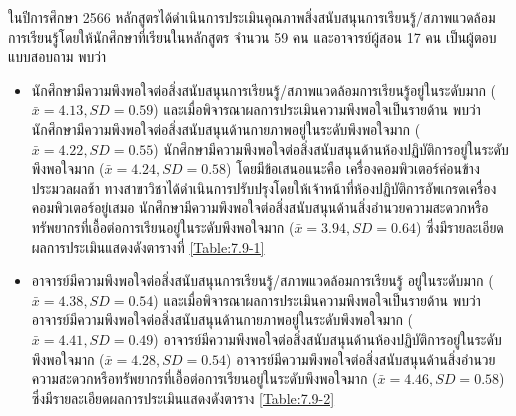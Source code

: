 ในปีการศึกษา 2566 หลักสูตรได้ดำเนินการประเมินคุณภาพสิ่งสนับสนุนการเรียนรู้/สภาพแวดล้อมการเรียนรู้โดยให้นักศึกษาที่เรียนในหลักสูตร จำนวน 59 คน และอาจารย์ผู้สอน 17 คน เป็นผู้ตอบแบบสอบถาม พบว่า
\begin{itemize}
\item นักศึกษามีความพึงพอใจต่อสิ่งสนับสนุนการเรียนรู้/สภาพแวดล้อมการเรียนรู้อยู่ในระดับมาก ($\bar x=4.13, SD=0.59$)
และเมื่อพิจารณาผลการประเมินความพึงพอใจเป็นรายด้าน พบว่านักศึกษามีความพึงพอใจต่อสิ่งสนับสนุนด้านกายภาพอยู่ในระดับพึงพอใจมาก ($\bar x=4.22, SD=0.55$)  นักศึกษามีความพึงพอใจต่อสิ่งสนับสนุนด้านห้องปฏิบัติการอยู่ในระดับพึงพอใจมาก ($\bar x=4.24, SD=0.58$) โดยมีข้อเสนอแนะคือ เครื่องคอมพิวเตอร์ค่อนข้างประมวลผลช้า ทางสาขาวิชาได้ดำเนินการปรับปรุงโดยให้เจ้าหน้าที่ห้องปฏิบัติการอัพเกรดเครื่องคอมพิวเตอร์อยู่เสมอ
นักศึกษามีความพึงพอใจต่อสิ่งสนับสนุนด้านสิ่งอำนวยความสะดวกหรือทรัพยากรที่เอื้อต่อการเรียนอยู่ในระดับพึงพอใจมาก ($\bar x=3.94, SD=0.64$) ซึ่งมีรายละเอียดผลการประเมินแสดงดังตารางที่ \ref{Table:7.9-1}

\item อาจารย์มีความพึงพอใจต่อสิ่งสนับสนุนการเรียนรู้/สภาพแวดล้อมการเรียนรู้ อยู่ในระดับมาก ($\bar x =4.38, SD=0.54$)
และเมื่อพิจารณาผลการประเมินความพึงพอใจเป็นรายด้าน พบว่าอาจารย์มีความพึงพอใจต่อสิ่งสนับสนุนด้านกายภาพอยู่ในระดับพึงพอใจมาก ($\bar x=4.41, SD=0.49$)  อาจารย์มีความพึงพอใจต่อสิ่งสนับสนุนด้านห้องปฏิบัติการอยู่ในระดับพึงพอใจมาก ($\bar x=4.28, SD=0.54$)
อาจารย์มีความพึงพอใจต่อสิ่งสนับสนุนด้านสิ่งอำนวยความสะดวกหรือทรัพยากรที่เอื้อต่อการเรียนอยู่ในระดับพึงพอใจมาก ($\bar x=4.46, SD=0.58$) ซึ่งมีรายละเอียดผลการประเมินแสดงดังตาราง \ref{Table:7.9-2}
\end{itemize}
